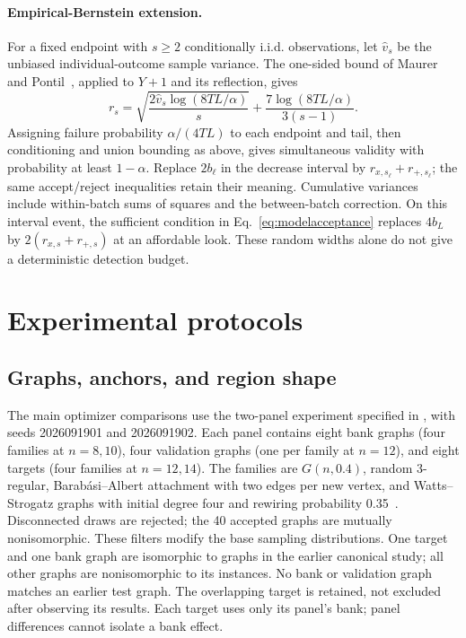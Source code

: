 \documentclass[11pt]{article}
\begin{document}
\paragraph{Empirical-Bernstein extension.}
For a fixed endpoint with $s\ge2$ conditionally i.i.d. observations, let
$\widehat v_s$ be the unbiased individual-outcome sample variance. The
one-sided bound of Maurer and Pontil~\cite[Theorem~4]{maurer2009}, applied
to $Y+1$ and its reflection, gives
\begin{equation}
 r_s=\sqrt{\frac{2\widehat v_s\log(8TL/\alpha)}{s}}
       +\frac{7\log(8TL/\alpha)}{3(s-1)}.
 \label{eq:bernstein}
\end{equation}
Assigning failure probability $\alpha/(4TL)$ to each endpoint and tail,
then conditioning and union bounding as above, gives simultaneous validity
with probability at least $1-\alpha$. Replace $2b_\ell$ in the decrease
interval by $r_{x,s_\ell}+r_{+,s_\ell}$; the same accept/reject inequalities
retain their meaning. Cumulative variances include within-batch sums of
squares and the between-batch correction. On this interval event, the
sufficient condition in Eq.~\eqref{eq:modelacceptance} replaces $4b_L$ by
$2(r_{x,s}+r_{+,s})$ at an affordable look. These random widths alone do
not give a deterministic detection budget.

\section{Experimental protocols}
\label{sec:experimental-protocol}

\subsection{Graphs, anchors, and region shape}
The main optimizer comparisons use the two-panel experiment specified in
, with seeds 2026091901 and 2026091902.
Each panel contains eight bank graphs (four families at $n=8,10$), four
validation graphs (one per family at $n=12$), and eight targets (four
families at $n=12,14$). The families are $G(n,0.4)$, random 3-regular,
Barab\'asi--Albert attachment with two edges per new vertex, and
Watts--Strogatz graphs with initial degree four and rewiring probability
0.35~\cite{gilbert1959,steger1999,barabasi1999,watts1998,hagberg2008}.
Disconnected draws are rejected; the 40 accepted graphs are mutually
nonisomorphic. These filters modify the base sampling distributions.
One target and one bank graph are isomorphic to graphs in the earlier
canonical study; all other graphs are nonisomorphic to its instances.
No bank or validation graph matches an earlier test graph. The overlapping
target is retained, not excluded after observing its results. Each target
uses only its panel's bank; panel differences cannot isolate a bank effect.
\end{document}
